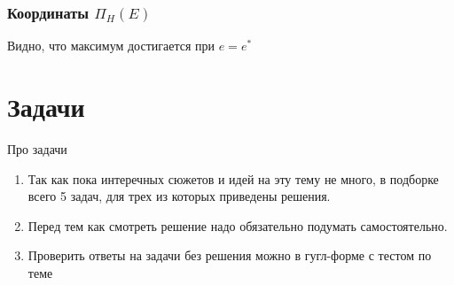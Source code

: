 \subsubsection{Координаты $\Pi_H(E)$}
\begin{center}
    \end{center}
\smallskip\indent\setlength{\parindent}{1em}Видно, что максимум достигается при $e=e^*$
\newpage

\section{Задачи}

\begin{mybox}{Про задачи}
    \begin{enumerate}
        \item Так как пока интеречных сюжетов и идей на эту тему не много, в подборке всего 5 задач, для трех из
        которых приведены решения.
        \item Перед тем как смотреть решение надо обязательно подумать самостоятельно.
        \item Проверить ответы на задачи без решения можно в гугл-форме с тестом по теме
    \end{enumerate}
\end{mybox}

